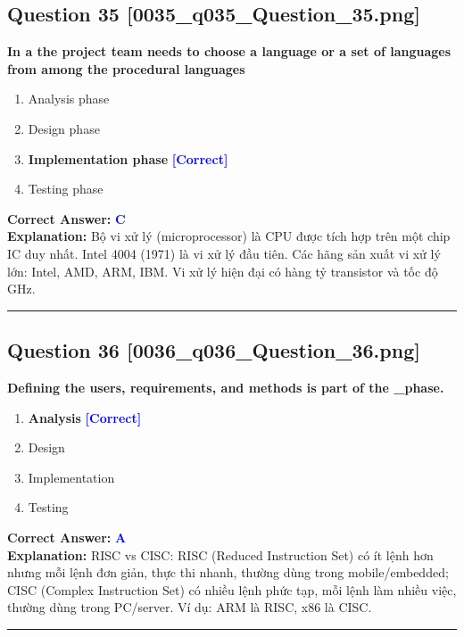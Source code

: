 \documentclass[11pt,a4paper]{article}
\begin{document}
\begin{minipage}{\textwidth}
\subsection*{Question 35 \quad \footnotesize{[0035\_q035\_Question\_35.png]}}
\noindent \textbf{In a the project team needs to choose a language or a set of languages from among the procedural languages}

\begin{enumerate}[label=\Alph*.]
    \item Analysis phase
    \item Design phase
    \item \textbf{Implementation phase} \hfill \textcolor{blue}{\textbf{[Correct]}}
    \item Testing phase
\end{enumerate}

\noindent \textbf{Correct Answer:} \textcolor{blue}{\textbf{C}} \\[2pt]
\noindent \textbf{Explanation:} Bộ vi xử lý (microprocessor) là CPU được tích hợp trên một chip IC duy nhất. Intel 4004 (1971) là vi xử lý đầu tiên. Các hãng sản xuất vi xử lý lớn: Intel, AMD, ARM, IBM. Vi xử lý hiện đại có hàng tỷ transistor và tốc độ GHz.

\par\vspace{0.3cm}
\hrule
\vspace{0.3cm}
\end{minipage}

\begin{minipage}{\textwidth}
\subsection*{Question 36 \quad \footnotesize{[0036\_q036\_Question\_36.png]}}
\noindent \textbf{Defining the users, requirements, and methods is part of the \_phase.}

\begin{enumerate}[label=\Alph*.]
    \item \textbf{Analysis} \hfill \textcolor{blue}{\textbf{[Correct]}}
    \item Design
    \item Implementation
    \item Testing
\end{enumerate}

\noindent \textbf{Correct Answer:} \textcolor{blue}{\textbf{A}} \\[2pt]
\noindent \textbf{Explanation:} RISC vs CISC: RISC (Reduced Instruction Set) có ít lệnh hơn nhưng mỗi lệnh đơn giản, thực thi nhanh, thường dùng trong mobile/embedded; CISC (Complex Instruction Set) có nhiều lệnh phức tạp, mỗi lệnh làm nhiều việc, thường dùng trong PC/server. Ví dụ: ARM là RISC, x86 là CISC.

\par\vspace{0.3cm}
\hrule
\vspace{0.3cm}
\end{minipage}
\end{document}
